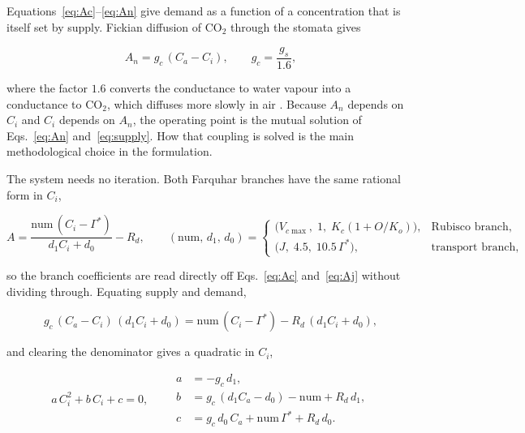 Equations~\eqref{eq:Ac}--\eqref{eq:An} give demand as a function of a
concentration that is itself set by supply. Fickian diffusion of CO$_2$ through
the stomata gives

\begin{equation}
A_n = g_c\,(C_a - C_i),
\qquad
g_c = \frac{g_s}{1.6},
\label{eq:supply}
\end{equation}

where the factor $1.6$ converts the conductance to water vapour into a conductance
to CO$_2$, which diffuses more slowly in air \citep{vonCaemmerer2000,Nobel2009}.
Because $A_n$ depends on $C_i$ and $C_i$ depends on $A_n$, the operating point is
the mutual solution of Eqs.~\eqref{eq:An} and~\eqref{eq:supply}. How that coupling
is solved is the main methodological choice in the formulation.

The system needs no iteration. Both Farquhar branches have the same rational form
in $C_i$,

\begin{equation}
A = \frac{\mathrm{num}\,(C_i - \Gamma^{*})}{d_1 C_i + d_0} - R_d,
\qquad
(\mathrm{num},\,d_1,\,d_0) =
\begin{cases}
\bigl(V_{c\max},\; 1,\; K_c(1 + O/K_o)\bigr), & \text{Rubisco branch}, \\[4pt]
\bigl(J,\; 4.5,\; 10.5\,\Gamma^{*}\bigr), & \text{transport branch},
\end{cases}
\label{eq:branch_form}
\end{equation}

so the branch coefficients are read directly off Eqs.~\eqref{eq:Ac}
and~\eqref{eq:Aj} without dividing through. Equating supply and demand,

\begin{equation}
g_c\,(C_a - C_i)\,(d_1 C_i + d_0)
= \mathrm{num}\,(C_i - \Gamma^{*}) - R_d\,(d_1 C_i + d_0),
\label{eq:closure_raw}
\end{equation}

and clearing the denominator gives a quadratic in $C_i$,

\begin{equation}
a\,C_i^{2} + b\,C_i + c = 0,
\qquad
\begin{aligned}
a &= -g_c\,d_1, \\
b &= g_c\,(d_1 C_a - d_0) - \mathrm{num} + R_d\,d_1, \\
c &= g_c\,d_0\,C_a + \mathrm{num}\,\Gamma^{*} + R_d\,d_0 .
\end{aligned}
\label{eq:ci_quadratic}
\end{equation}

